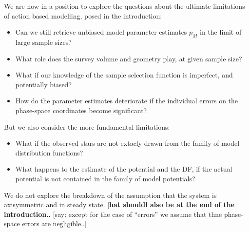 We are now in a position to explore the questions about the ultimate limitations of action based modelling, posed in the introduction: 
\begin{itemize}
\item Can we still retrieve unbiased  model parameter estimates $p_M$ in the limit of large sample sizes? 
\item What role does the survey volume and geometry play, at given sample size? 
\item What if our knowledge of the sample selection function is imperfect, and potentially biased? 
\item How do the parameter estimates deteriorate if the individual errors on the phase-space coordinates become significant? 
\end{itemize}
But we also consider the more fundamental limitations:
\begin{itemize}
\item What if the observed stars are not extacly drawn from the family of model distribution functions? 
\item What happens to the estimate of the potential and the DF, if the actual potential is not contained in the family of model potentials?
\end{itemize}
We do not explore the breakdown of the assumption that the system is axisymmetric and in steady state.
[{\bf hat shouldl also be at the end of the introduction..}
[say: except for the case of ``errors'' we assume that thne phase-space errors are negligible..]




